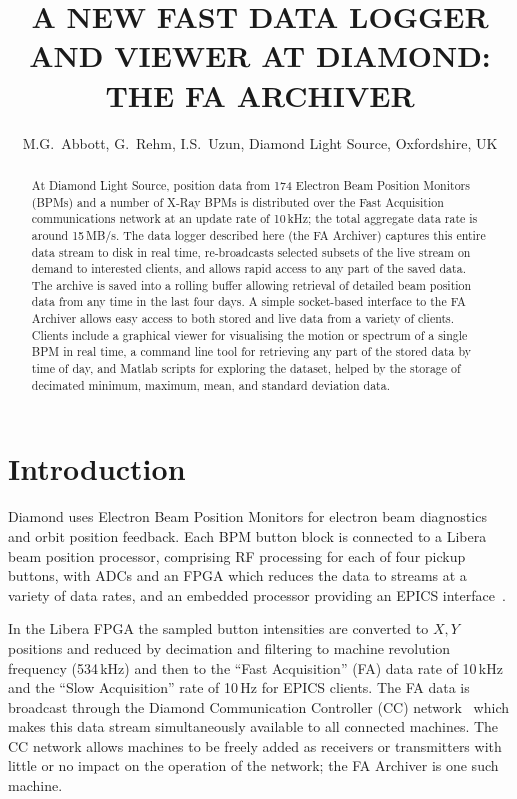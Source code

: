 \documentclass{JAC2003}
\begin{document}
\title{A NEW FAST DATA LOGGER AND VIEWER AT DIAMOND:\\THE FA ARCHIVER}

\author{%
    M.G.~Abbott, G.~Rehm, I.S.~Uzun,
    Diamond Light Source, Oxfordshire, UK}

\maketitle

\begin{abstract}

At Diamond Light Source, position data from 174 Electron Beam Position
Monitors (BPMs) and a number of X-Ray BPMs is distributed over the Fast
Acquisition communications network at an update rate of 10\,kHz; the total
aggregate data rate is around 15\,MB/s. The data logger described here (the FA
Archiver) captures this entire data stream to disk in real time, re-broadcasts
selected subsets of the live stream on demand to interested clients, and allows
rapid access to any part of the saved data. The archive is saved into a rolling
buffer allowing retrieval of detailed beam position data from any time in the
last four days. A simple socket-based interface to the FA Archiver allows easy
access to both stored and live data from a variety of clients. Clients
include a graphical viewer for visualising the motion or spectrum of a single
BPM in real time, a command line tool for retrieving any part of the stored data
by time of day, and Matlab scripts for exploring the dataset, helped by the
storage of decimated minimum, maximum, mean, and standard deviation data.

\end{abstract}


\section{Introduction}

Diamond uses Electron Beam Position Monitors for electron beam diagnostics and
orbit position feedback.  Each BPM button block is connected to a
Libera~\cite{i-tech} beam position processor, comprising RF processing for each
of four pickup buttons, with ADCs and an FPGA which reduces the data to streams
at a variety of data rates, and an embedded processor providing an EPICS
interface~\cite{control-system}.

In the Libera FPGA the sampled button intensities are converted to $X,Y$
positions and reduced by decimation and filtering to machine revolution
frequency (534\,kHz) and then to the ``Fast Acquisition'' (FA) data rate of
10\,kHz and the ``Slow Acquisition'' rate of 10\,Hz for EPICS clients.  The FA
data is broadcast through the Diamond Communication Controller (CC)
network~\cite{cc, fast-feedback} which makes this data stream simultaneously
available to all connected machines.  The CC network allows machines to be
freely added as receivers or transmitters with little or no impact on the
operation of the network; the FA Archiver is one such machine.
\end{document}
